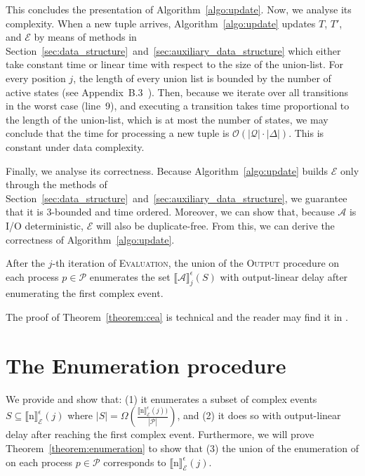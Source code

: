 This concludes the presentation of Algorithm~\ref{algo:update}. Now, we analyse its complexity. When a new tuple arrives, Algorithm~\ref{algo:update} updates $T$, $T'$, and $\mathcal{E}$ by means of methods in Section~\ref{sec:data_structure}~and~\ref{sec:auxiliary_data_structure} which either take constant time or linear time with respect to the size of the union-list. For every position $j$, the length of every union list is bounded by the number of active states (see Appendix~B.3~\cite{core}). Then, because we iterate over all transitions in the worst case (line~9), and executing a transition takes time proportional to the length of the union-list, which is at most the number of states, we may conclude that the time for processing a new tuple is $\mathcal{O}(|\mathcal{Q}| \cdot |\Delta|)$. This is constant under data complexity.

Finally, we analyse its correctness. Because Algorithm~\ref{algo:update} builds $\mathcal{E}$ only through the methods of Section~\ref{sec:data_structure}~and~\ref{sec:auxiliary_data_structure}, we guarantee that it is $3$-bounded and time ordered. Moreover, we can show that, because $\mathcal{A}$ is I/O deterministic, $\mathcal{E}$ will also be duplicate-free. From this, we can derive the correctness of Algorithm~\ref{algo:update}.

\begin{theorem}\label{theorem:cea}
  After the $j$-th iteration of \textsc{Evaluation}, the union of the \textsc{Output} procedure on each process $p \in \mathcal{P}$ enumerates the set ${\llbracket \mathcal{A} \rrbracket}^{\epsilon}_{j}(S)$ with output-linear delay after enumerating the first complex event.
\end{theorem}

The proof of Theorem~\ref{theorem:cea} is technical and the reader may find it in \cite{core}.

\section{The Enumeration procedure}\label{sec:enumeration}

We provide  and show that: (1) it enumerates a subset of complex events $S \subseteq {\llbracket \text{n} \rrbracket}^{\epsilon}_{\mathcal{E}}(j)$ where $|S| = \Omega(\frac{{\llbracket \text{n} \rrbracket}^{\epsilon}_{\mathcal{E}}(j))}{|\mathcal{P}|})$, and (2) it does so with output-linear delay after reaching the first complex event. Furthermore, we will prove Theorem~\ref{theorem:enumeration} to show that (3) the union of the enumeration of  on each process $p \in \mathcal{P}$ corresponds to ${\llbracket \text{n} \rrbracket}^{\epsilon}_{\mathcal{E}}(j)$.

